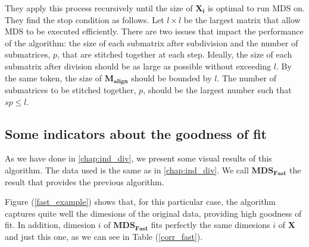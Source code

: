 \documentclass[11pt]{report}
\begin{document}
\indent They apply this process recursively until the size of $\mathbf{X_i}$ is
optimal to run MDS on. They find the stop condition as follows. Let 
$l \times l$ be the largest matrix that allow MDS to be executed efficiently. 
There are two issues that impact the performance of the algorithm: the size of 
each submatrix after subdivision and the number of submatrices, $p$, that are 
stitched together at each step. Ideally, the size of each submatrix after 
division should be as large as possible without exceeding $l$. By the same
token, the size of $\mathbf{M_{align}}$ should be bounded by $l$. The number of 
submatrices to be stitched together, $p$, should be the largest number such 
that $sp \leq l$.

\subsection{Some indicators about the goodness of fit}
As we have done in \autoref{chap:ind_div}, we present some visual results of
this algorithm. The data used is the same as in \autoref{chap:ind_div}. We
call $\mathbf{MDS_{Fast}}$ the result that provides the previous algorithm.

\indent Figure (\ref{fast_example}) shows that, for this particular case,
the algorithm captures quite well the dimesions of the original data, 
providing high goodness of fit. In addition, dimesion $i$ of 
$\mathbf{MDS_{Fast}}$ fits perfectly the same dimesions $i$ of \textbf{X} and 
just this one, as we can see in Table (\ref{corr_fast}).
\end{document}

